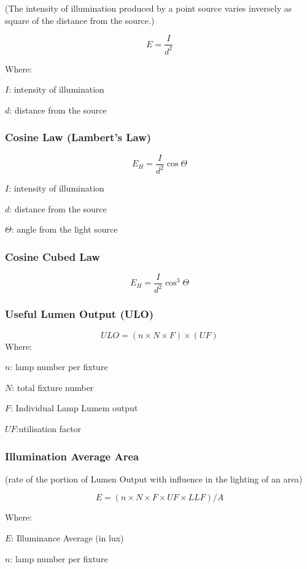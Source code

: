 \documentclass[]{book}
\theoremstyle{definition}
\theoremstyle{definition}
\theoremstyle{definition}
\theoremstyle{remark}
\begin{document}
(The intensity of illumination produced by a point source varies
inversely as square of the distance from the source.)

\[E = \frac{I}{d^2}\]

Where:

\(I\): intensity of illumination

\(d\): distance from the source

\subsubsection{Cosine Law (Lambert's
Law)}\label{cosine-law-lamberts-law}

\[E_H = \frac{I}{d^2}\cos\Theta\]

\(I\): intensity of illumination

\(d\): distance from the source

\(\Theta\): angle from the light source

\subsubsection{Cosine Cubed Law}\label{cosine-cubed-law}

\[E_H = \frac{I}{d^2}\cos^3\Theta\]

\subsubsection{Useful Lumen Output (ULO)}\label{useful-lumen-output-ulo}

\[ULO = (n\times N\times F)\times(UF)\] Where:

\(n\): lamp number per fixture

\(N\): total fixture number

\(F\): Individual Lamp Lumem output

\(UF\):utilisation factor

\subsubsection{Illumination Average
Area}\label{illumination-average-area}

(rate of the portion of Lumen Output with influence in the lighting of
an area)

\[E = (n\times N\times F \times UF \times LLF)/A\]

Where:

\(E\): Illuminance Average (in lux)

\(n\): lamp number per fixture
\end{document}
